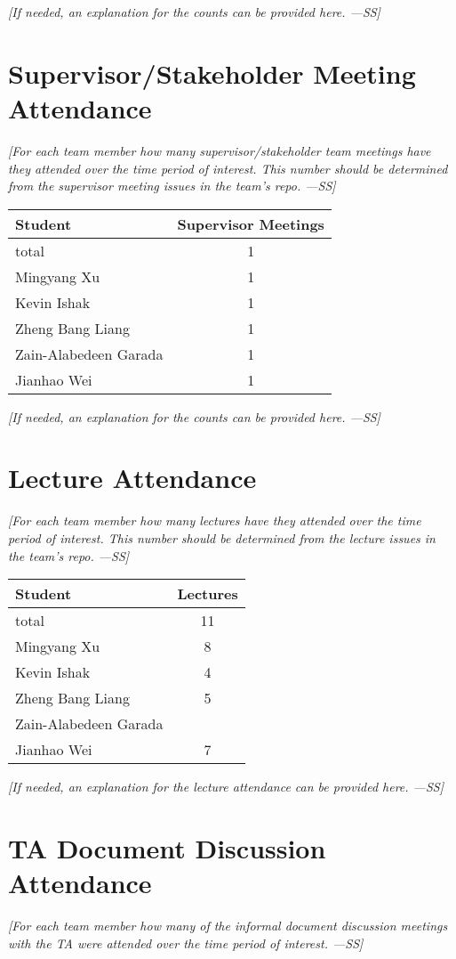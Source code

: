 \documentclass[12pt]{article}
\begin{document}
\textit{[If needed, an explanation for the counts can be provided here. ---SS]}

\section{Supervisor/Stakeholder Meeting Attendance}
\textit{[For each team member how many supervisor/stakeholder team meetings have they attended over the time period of interest. This number should be determined from the supervisor meeting issues in the team’s repo. ---SS]}

\begin{longtable}{|l|c|}
\hline
\textbf{Student} & \textbf{Supervisor Meetings} \\
\hline
total & 1 \\
Mingyang Xu & 1 \\
Kevin Ishak & 1 \\
Zheng Bang Liang & 1 \\
Zain-Alabedeen Garada & 1 \\
Jianhao Wei & 1 \\
\hline
\end{longtable}

\textit{[If needed, an explanation for the counts can be provided here. ---SS]}

\section{Lecture Attendance}
\textit{[For each team member how many lectures have they attended over the time period of interest. This number should be determined from the lecture issues in the team’s repo. ---SS]}

\begin{longtable}{|l|c|}
\hline
\textbf{Student} & \textbf{Lectures} \\
\hline
total & 11 \\
Mingyang Xu & 8 \\
Kevin Ishak & 4 \\
Zheng Bang Liang & 5 \\
Zain-Alabedeen Garada &  \\
Jianhao Wei & 7 \\
\hline
\end{longtable}

\textit{[If needed, an explanation for the lecture attendance can be provided here. ---SS]}

\section{TA Document Discussion Attendance}
\textit{[For each team member how many of the informal document discussion meetings with the TA were attended over the time period of interest. ---SS]}
\end{document}
